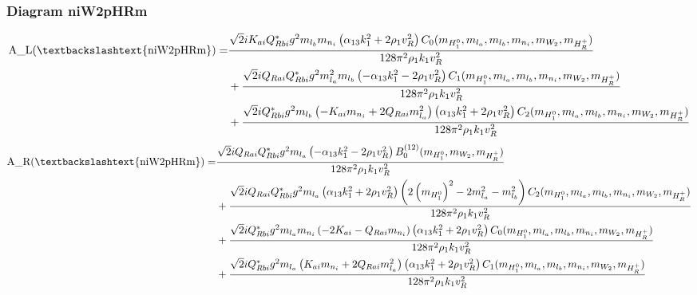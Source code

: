 \documentclass{article}
\begin{document}
\subsubsection{Diagram niW2pHRm}
\begin{align*}
\mathtt{\text{A\_L(\textbackslashtext\{niW2pHRm\})}} = & \frac{\sqrt{2} i K_{ai} Q_{Rbi}^* g^{2} m_{l_b} m_{n_i} \left(\alpha_{13} k_{1}^{2} + 2 \rho_{1} v_{R}^{2}\right) C_0(m_{H_1^0}, m_{l_a}, m_{l_b}, m_{n_i}, m_{W_2}, m_{H_R^+})}{128 \pi^{2} \rho_{1} k_{1} v_{R}^{2}} \\
& + \frac{\sqrt{2} i Q_{Rai} Q_{Rbi}^* g^{2} m_{l_a}^{2} m_{l_b} \left(- \alpha_{13} k_{1}^{2} - 2 \rho_{1} v_{R}^{2}\right) C_1(m_{H_1^0}, m_{l_a}, m_{l_b}, m_{n_i}, m_{W_2}, m_{H_R^+})}{128 \pi^{2} \rho_{1} k_{1} v_{R}^{2}} \\
& + \frac{\sqrt{2} i Q_{Rbi}^* g^{2} m_{l_b} \left(- K_{ai} m_{n_i} + 2 Q_{Rai} m_{l_a}^{2}\right) \left(\alpha_{13} k_{1}^{2} + 2 \rho_{1} v_{R}^{2}\right) C_2(m_{H_1^0}, m_{l_a}, m_{l_b}, m_{n_i}, m_{W_2}, m_{H_R^+})}{128 \pi^{2} \rho_{1} k_{1} v_{R}^{2}} 
\end{align*}
\begin{align*}
\mathtt{\text{A\_R(\textbackslashtext\{niW2pHRm\})}} = & \frac{\sqrt{2} i Q_{Rai} Q_{Rbi}^* g^{2} m_{l_a} \left(- \alpha_{13} k_{1}^{2} - 2 \rho_{1} v_{R}^{2}\right) B^{\left(12\right)}_0(m_{H_1^0}, m_{W_2}, m_{H_R^+})}{128 \pi^{2} \rho_{1} k_{1} v_{R}^{2}} \\
& + \frac{\sqrt{2} i Q_{Rai} Q_{Rbi}^* g^{2} m_{l_a} \left(\alpha_{13} k_{1}^{2} + 2 \rho_{1} v_{R}^{2}\right) \left(2 \left(m_{H_1^0}\right)^{2} - 2 m_{l_a}^{2} - m_{l_b}^{2}\right) C_2(m_{H_1^0}, m_{l_a}, m_{l_b}, m_{n_i}, m_{W_2}, m_{H_R^+})}{128 \pi^{2} \rho_{1} k_{1} v_{R}^{2}} \\
& + \frac{\sqrt{2} i Q_{Rbi}^* g^{2} m_{l_a} m_{n_i} \left(- 2 K_{ai} - Q_{Rai} m_{n_i}\right) \left(\alpha_{13} k_{1}^{2} + 2 \rho_{1} v_{R}^{2}\right) C_0(m_{H_1^0}, m_{l_a}, m_{l_b}, m_{n_i}, m_{W_2}, m_{H_R^+})}{128 \pi^{2} \rho_{1} k_{1} v_{R}^{2}} \\
& + \frac{\sqrt{2} i Q_{Rbi}^* g^{2} m_{l_a} \left(K_{ai} m_{n_i} + 2 Q_{Rai} m_{l_a}^{2}\right) \left(\alpha_{13} k_{1}^{2} + 2 \rho_{1} v_{R}^{2}\right) C_1(m_{H_1^0}, m_{l_a}, m_{l_b}, m_{n_i}, m_{W_2}, m_{H_R^+})}{128 \pi^{2} \rho_{1} k_{1} v_{R}^{2}} 
\end{align*}
\end{document}
